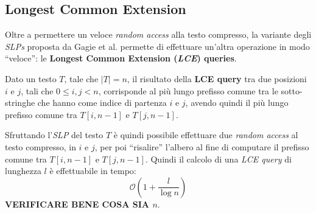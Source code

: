 \subsection{Longest Common Extension}
Oltre a permettere un veloce \textit{random access} alla testo compresso, la
variante degli \textit{SLPs} proposta da Gagie et al. permette di effettuare
un'altra operazione in modo ``veloce'': le \textbf{Longest Common Extension
  (\textit{LCE}) queries}.
\begin{definizione}
  Dato un testo $T$, tale che $|T|=n$, il risultato della \textbf{LCE query} tra
  due posizioni $i$ e $j$, tali che $0\leq i,j<n$, corrisponde al più lungo
  prefisso comune tra le sotto-stringhe che hanno come indice di partenza $i$ e
  $j$, avendo quindi il più lungo prefisso comune tra $T[i,n-1]$ e $T[j,n-1]$.
\end{definizione}
Sfruttando l'\textit{SLP} del testo $T$ è quindi possibile effettuare due
\textit{random access} al testo compresso, in $i$ e $j$, per poi ``risalire''
l'albero al fine di computare il prefisso comune tra $T[i,n-1]$ e
$T[j,n-1]$. Quindi il calcolo di una \textit{LCE query} di lunghezza $l$ è
effettuabile in tempo:
\[\mathcal{O}\left(1+\frac{l}{\log n}\right)\]
\textbf{VERIFICARE BENE COSA SIA $n$}.